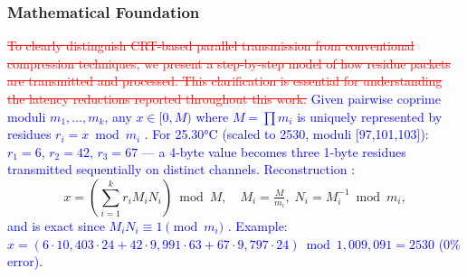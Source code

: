 \documentclass[pdflatex,sn-mathphys-num]{sn-jnl}
\theoremstyle{thmstyleone}
\theoremstyle{thmstyletwo}
\theoremstyle{thmstylethree}
\begin{document}
{\subsubsection{Mathematical Foundation}
\label{subsubsec:parallel_transmission}

\textcolor{red}{\sout{To clearly distinguish CRT-based parallel transmission from conventional compression techniques, we present a step-by-step model of how residue packets are transmitted and processed. This clarification is essential for understanding the latency reductions reported throughout this work.}}
\textcolor{blue}{Given pairwise coprime moduli $m_1,\ldots,m_k$, any $x \in [0,M)$ where $M=\prod m_i$ is uniquely represented by residues $r_i = x \bmod m_i$ \cite{garner1959residue}. For 25.30°C (scaled to 2530, moduli [97,101,103]): $r_1=6$, $r_2=42$, $r_3=67$ — a 4-byte value becomes three 1-byte residues transmitted sequentially on distinct channels. Reconstruction \cite{knuth1997art}:}
\begin{equation}
x = \left(\sum_{i=1}^k r_i M_i N_i\right) \bmod M, \quad M_i=\tfrac{M}{m_i},\; N_i=M_i^{-1}\bmod m_i,
\end{equation}
\textcolor{blue}{and is exact since $M_i N_i \equiv 1 \pmod{m_i}$ \cite{hardy2008introduction}. Example: $x=(6{\cdot}10{,}403{\cdot}24+42{\cdot}9{,}991{\cdot}63+67{\cdot}9{,}797{\cdot}24)\bmod 1{,}009{,}091=2530$ (0\% error).}

}
\end{document}
